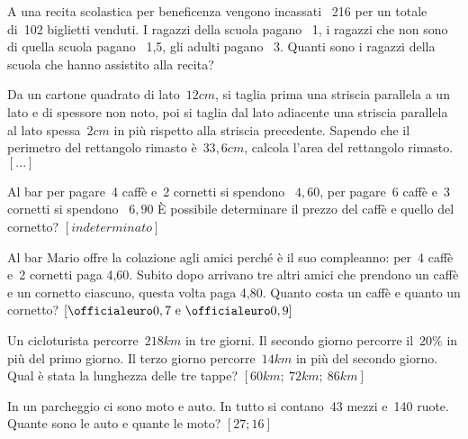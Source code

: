 \begin{multicols}{2}
\begin{esercizio}
 \label{ese:22.91}
A una recita scolastica per beneficenza vengono incassati
{\officialeuro}~216 per un totale di~102 biglietti venduti. I ragazzi della
scuola pagano {\officialeuro}~1, i ragazzi che non sono di quella scuola
pagano {\officialeuro}~1,5, gli adulti pagano {\officialeuro}~3. Quanti sono i
ragazzi della scuola che hanno assistito alla recita?
\end{esercizio}


\begin{esercizio}
 \label{ese:22.92}
Da un cartone quadrato di lato~$12\unit{cm}$, si taglia prima una striscia
parallela a un lato e di spessore non noto, poi si taglia dal lato
adiacente una striscia parallela al lato spessa~$2\unit{cm}$ in più rispetto
alla striscia precedente. Sapendo che il perimetro del rettangolo
rimasto è~$33,6\unit{cm}$, calcola l'area del rettangolo rimasto.
\hfill $\left[...\right]$
\end{esercizio}

\begin{esercizio}[\Ast]
 \label{ese:22.93}
Al bar per pagare~4 caffè e~2 cornetti si spendono {\officialeuro}~$4,60$, per 
pagare~6 caffè
e~3 cornetti si spendono {\officialeuro}~$6,90$ È possibile
determinare il prezzo del caffè e quello del cornetto?
\hfill $\left[indeterminato\right]$
\end{esercizio}

\begin{esercizio}[\Ast]
 \label{ese:22.94}
 Al bar Mario offre la colazione agli amici perché è il suo
compleanno: per~4 caffè e~2 cornetti paga {\officialeuro}4,60. Subito dopo
arrivano tre altri amici che prendono un caffè e un cornetto
ciascuno, questa volta paga {\officialeuro}4,80. Quanto costa un caffè e
quanto un cornetto?
\hfill $\left[\officialeuro 0,7 \text{ e } \officialeuro 0,9\right]$
\end{esercizio}

\begin{esercizio}[\Ast]
 \label{ese:22.95}
Un cicloturista percorre~$218\unit{km}$ in tre giorni. Il secondo giorno 
percorre
il~$20\%$ in più del primo giorno. Il terzo giorno percorre~$14\unit{km}$ in
più del secondo giorno. Qual è stata la lunghezza delle tre tappe?
\hfill $\left[60\unit{km};~72\unit{km};~86\unit{km}\right]$
\end{esercizio}

\begin{esercizio}[\Ast]
 \label{ese:22.96}
In un parcheggio ci sono moto e auto. In tutto si contano~43 mezzi e~140
ruote. Quante sono le auto e quante le moto?
\hfill $\left[27; 16\right]$
\end{esercizio}


\end{multicols}
